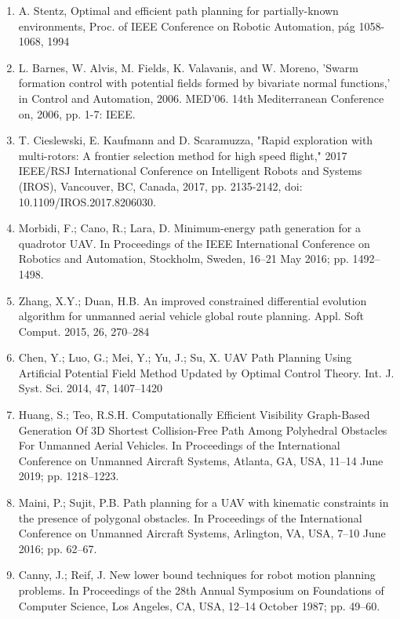\documentclass[11pt,epsf,times]{article}
\begin{document}
\begin{enumerate}
\item A. Stentz, Optimal and efficient path planning for partially-known environments, Proc. of IEEE Conference on Robotic Automation, pág 1058-1068, 1994
\item L. Barnes, W. Alvis, M. Fields, K. Valavanis, and W. Moreno, 'Swarm formation control with potential fields formed by bivariate normal functions,' in Control and Automation, 2006. MED'06. 14th Mediterranean Conference on, 2006, pp. 1-7: IEEE.
\item T. Cieslewski, E. Kaufmann and D. Scaramuzza, "Rapid exploration with multi-rotors: A frontier selection method for high speed flight," 2017 IEEE/RSJ International Conference on Intelligent Robots and Systems (IROS), Vancouver, BC, Canada, 2017, pp. 2135-2142, doi: 10.1109/IROS.2017.8206030.
\item Morbidi, F.; Cano, R.; Lara, D. Minimum-energy path generation for a quadrotor UAV. In Proceedings of the IEEE International
Conference on Robotics and Automation, Stockholm, Sweden, 16–21 May 2016; pp. 1492–1498. 
\item Zhang, X.Y.; Duan, H.B. An improved constrained differential evolution algorithm for unmanned aerial vehicle global route
planning. Appl. Soft Comput. 2015, 26, 270–284
\item Chen, Y.; Luo, G.; Mei, Y.; Yu, J.; Su, X. UAV Path Planning Using Artificial Potential Field Method Updated by Optimal Control
Theory. Int. J. Syst. Sci. 2014, 47, 1407–1420
\item Huang, S.; Teo, R.S.H. Computationally Efficient Visibility Graph-Based Generation Of 3D Shortest Collision-Free Path Among
Polyhedral Obstacles For Unmanned Aerial Vehicles. In Proceedings of the International Conference on Unmanned Aircraft
Systems, Atlanta, GA, USA, 11–14 June 2019; pp. 1218–1223.
\item Maini, P.; Sujit, P.B. Path planning for a UAV with kinematic constraints in the presence of polygonal obstacles. In Proceedings of
the International Conference on Unmanned Aircraft Systems, Arlington, VA, USA, 7–10 June 2016; pp. 62–67.
\item Canny, J.; Reif, J. New lower bound techniques for robot motion planning problems. In Proceedings of the 28th Annual
Symposium on Foundations of Computer Science, Los Angeles, CA, USA, 12–14 October 1987; pp. 49–60.
\end{enumerate}
\end{document}
